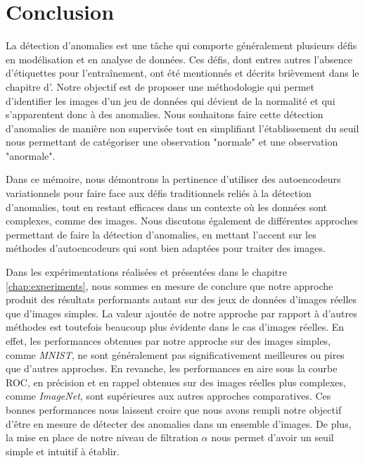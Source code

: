 \chapter*{Conclusion}           %
\label{chap:conclusion}         %

La détection d'anomalies est une tâche qui comporte généralement plusieurs défis en modélisation et en analyse de données. Ces défis, dont entres autres l'absence d'étiquettes pour l'entraînement, ont été mentionnés et décrits brièvement dans le chapitre d'. Notre objectif est de proposer une méthodologie qui permet d'identifier les images d'un jeu de données qui dévient de la normalité et qui s'apparentent donc à des anomalies. Nous souhaitons faire cette détection d'anomalies de manière non supervisée tout en simplifiant l'établissement du seuil nous permettant de catégoriser une observation "normale" et une observation "anormale". 

Dans ce mémoire, nous démontrons la pertinence d'utiliser des autoencodeurs variationnels pour faire face aux défis traditionnels reliés à la détection d'anomalies, tout en restant efficaces dans un contexte où les données sont complexes, comme des images. Nous discutons également de différentes approches permettant de faire la détection d'anomalies, en mettant l'accent sur les méthodes d'autoencodeurs qui sont bien adaptées pour traiter des images.

Dans les expérimentations réalisées et présentées dans le chapitre \ref{chap:experiments}, nous sommes en mesure de conclure que notre approche produit des résultats performants autant sur des jeux de données d'images réelles que d'images simples. La valeur ajoutée de notre approche par rapport à d'autres méthodes est toutefois beaucoup plus évidente dans le cas d'images réelles. En effet, les performances obtenues par notre approche sur des images simples, comme \textit{MNIST}, ne sont généralement pas significativement meilleures ou pires que d'autres approches. En revanche, les performances en aire sous la courbe ROC, en précision et en rappel obtenues sur des images réelles plus complexes, comme \textit{ImageNet}, sont supérieures aux autres approches comparatives. Ces bonnes performances nous laissent croire que nous avons rempli notre objectif d'être en mesure de détecter des anomalies dans un ensemble d'images. De plus, la mise en place de notre niveau de filtration $\alpha$ nous permet d'avoir un seuil simple et intuitif à établir.


